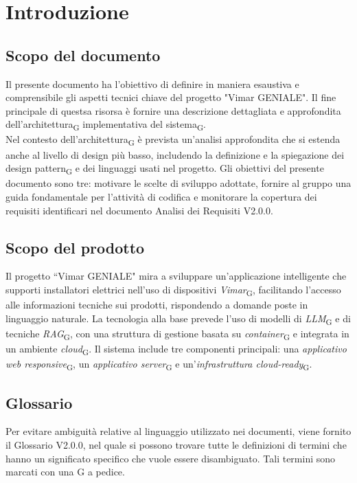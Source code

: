\section{Introduzione}
\subsection{Scopo del documento}
Il presente documento ha l’obiettivo di definire in maniera esaustiva e comprensibile gli aspetti tecnici chiave del progetto "Vimar GENIALE". Il fine principale di questsa risorsa è fornire una descrizione dettagliata e approfondita dell'architettura\textsubscript{G} implementativa del sistema\textsubscript{G}. \\
Nel contesto dell'architettura\textsubscript{G} è prevista un'analisi approfondita che si estenda anche al livello di design più basso, includendo la definizione e la spiegazione dei design pattern\textsubscript{G} e dei linguaggi usati nel progetto.
Gli obiettivi del presente documento sono tre: motivare le scelte di sviluppo adottate, fornire al gruppo una guida fondamentale per l'attività di codifica e monitorare la copertura dei requisiti identificari nel documento Analisi dei Requisiti V2.0.0.

\subsection{Scopo del prodotto}
Il progetto ``Vimar GENIALE" mira a sviluppare un'applicazione intelligente che supporti installatori elettrici nell'uso di dispositivi \textit{Vimar}\textsubscript{G}, facilitando l'accesso alle informazioni tecniche sui prodotti, rispondendo a domande poste in linguaggio naturale.
La tecnologia alla base prevede l'uso di modelli di \textit{LLM}\textsubscript{G} e di tecniche \textit{RAG}\textsubscript{G}, con una struttura di gestione basata su \textit{container}\textsubscript{G} e integrata in un ambiente \textit{cloud}\textsubscript{G}.
Il sistema include tre componenti principali: una \textit{applicativo web responsive}\textsubscript{G}, un \textit{applicativo server}\textsubscript{G} e un'\textit{infrastruttura cloud-ready}\textsubscript{G}. 
\subsection{Glossario}
Per evitare ambiguità relative al linguaggio utilizzato nei documenti, viene fornito il Glossario V2.0.0, nel quale si possono trovare tutte le definizioni di termini che hanno un significato specifico che vuole essere disambiguato. Tali termini sono marcati con una G a pedice. 
